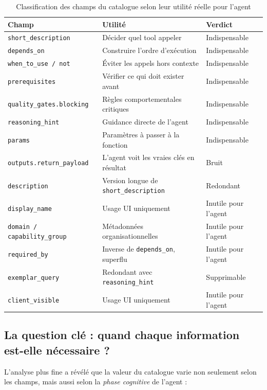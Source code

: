 \documentclass[12pt, a4paper]{article}
\begin{document}
\begin{table}[h]
\centering
\begin{tabularx}{\textwidth}{lXl}
\toprule
Champ & Utilité & Verdict\\
\midrule
\texttt{short\_description} & Décider quel tool appeler & Indispensable\\
\texttt{depends\_on} & Construire l'ordre d'exécution & Indispensable\\
\texttt{when\_to\_use / not} & Éviter les appels hors contexte & Indispensable\\
\texttt{prerequisites} & Vérifier ce qui doit exister avant & Indispensable\\
\texttt{quality\_gates.blocking} & Règles comportementales critiques & Indispensable\\
\texttt{reasoning\_hint} & Guidance directe de l'agent & Indispensable\\
\texttt{params} & Paramètres à passer à la fonction & Indispensable\\
\midrule
\texttt{outputs.return\_payload} & L'agent voit les vraies clés en résultat & Bruit\\
\texttt{description} & Version longue de \texttt{short\_description} & Redondant\\
\texttt{display\_name} & Usage UI uniquement & Inutile pour l'agent\\
\texttt{domain / capability\_group} & Métadonnées organisationnelles & Inutile pour l'agent\\
\texttt{required\_by} & Inverse de \texttt{depends\_on}, superflu & Inutile pour l'agent\\
\texttt{exemplar\_query} & Redondant avec \texttt{reasoning\_hint} & Supprimable\\
\texttt{client\_visible} & Usage UI uniquement & Inutile pour l'agent\\
\bottomrule
\end{tabularx}
\caption{Classification des champs du catalogue selon leur utilité réelle pour l'agent}
\end{table}

\subsection{La question clé : quand chaque information est-elle nécessaire ?}

L'analyse plus fine a révélé que la valeur du catalogue varie non seulement
selon les champs, mais aussi selon la \emph{phase cognitive} de l'agent :
\end{document}
